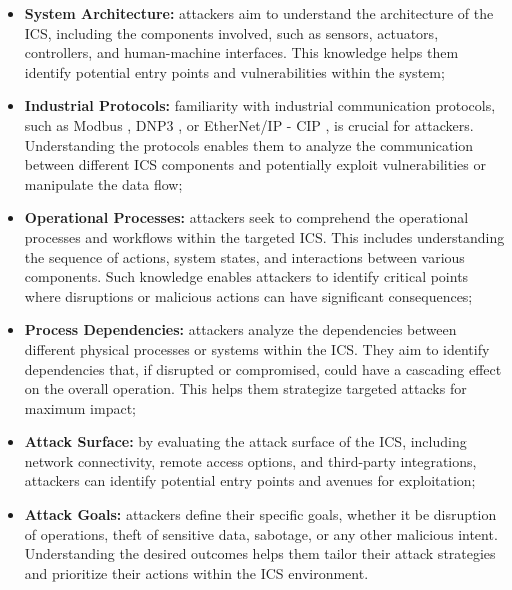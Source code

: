 \begin{itemize}
	\item \textbf{System Architecture:} attackers aim to understand the architecture of the ICS, including the components involved, such as sensors, actuators, controllers, and human-machine interfaces. This knowledge helps them identify potential entry points and vulnerabilities within the system;
	
	\item \textbf{Industrial Protocols:} familiarity with industrial communication protocols, such as Modbus \cite{Modbus_definition}, DNP3 \cite{dnp3}, or EtherNet/IP - CIP \cite{enip_pdf}, is crucial for attackers. Understanding the protocols enables them to analyze the communication between different ICS components and potentially exploit vulnerabilities or manipulate the data flow; 
	
	\item \textbf{Operational Processes:} attackers seek to comprehend the operational processes and workflows within the targeted ICS. This includes understanding the sequence of actions, system states, and interactions between various components. Such knowledge enables attackers to identify critical points where disruptions or malicious actions can have significant consequences;
	
	\item \textbf{Process Dependencies:} attackers analyze the dependencies between different physical processes or systems within the ICS. They aim to identify dependencies that, if disrupted or compromised, could have a cascading effect on the overall operation. This helps them strategize targeted attacks for maximum impact;
	
	
	\item \textbf{Attack Surface:} by evaluating the attack surface of the ICS, including network connectivity, remote access options, and third-party integrations, attackers can identify potential entry points and avenues for exploitation;
	
	\item \textbf{Attack Goals:} attackers define their specific goals, whether it be disruption of operations, theft of sensitive data, sabotage, or any other malicious intent. Understanding the desired outcomes helps them tailor their attack strategies and prioritize their actions within the ICS environment.
	
\end{itemize}

